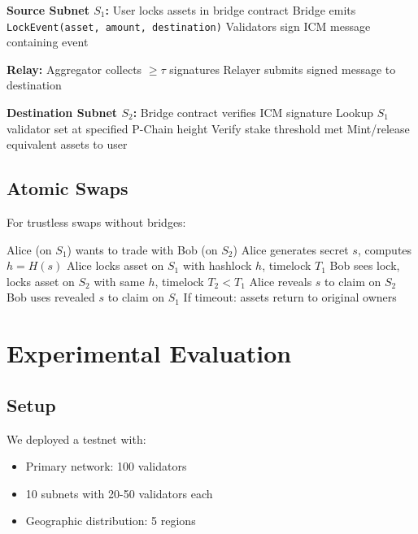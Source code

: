 \documentclass[11pt,a4paper]{article}
\begin{document}
\begin{algorithm}
\caption{Cross-Subnet Asset Transfer}
\begin{algorithmic}[1]
\STATE \textbf{Source Subnet $S_1$:}
\STATE User locks assets in bridge contract
\STATE Bridge emits \texttt{LockEvent(asset, amount, destination)}
\STATE Validators sign ICM message containing event

\STATE \textbf{Relay:}
\STATE Aggregator collects $\geq \tau$ signatures
\STATE Relayer submits signed message to destination

\STATE \textbf{Destination Subnet $S_2$:}
\STATE Bridge contract verifies ICM signature
\STATE Lookup $S_1$ validator set at specified P-Chain height
\STATE Verify stake threshold met
\STATE Mint/release equivalent assets to user
\end{algorithmic}
\end{algorithm}

\subsection{Atomic Swaps}

For trustless swaps without bridges:

\begin{algorithm}
\caption{Cross-Subnet Atomic Swap}
\begin{algorithmic}[1]
\STATE Alice (on $S_1$) wants to trade with Bob (on $S_2$)
\STATE Alice generates secret $s$, computes $h = H(s)$
\STATE Alice locks asset on $S_1$ with hashlock $h$, timelock $T_1$
\STATE Bob sees lock, locks asset on $S_2$ with same $h$, timelock $T_2 < T_1$
\STATE Alice reveals $s$ to claim on $S_2$
\STATE Bob uses revealed $s$ to claim on $S_1$
\STATE If timeout: assets return to original owners
\end{algorithmic}
\end{algorithm}

\section{Experimental Evaluation}

\subsection{Setup}

We deployed a testnet with:
\begin{itemize}
    \item Primary network: 100 validators
    \item 10 subnets with 20-50 validators each
    \item Geographic distribution: 5 regions
\end{itemize}
\end{document}
